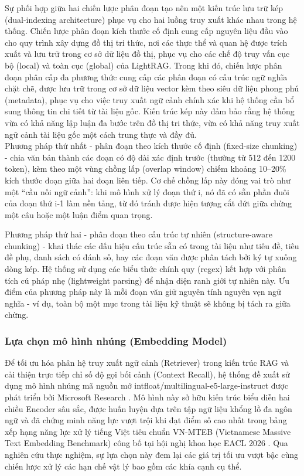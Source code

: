 \indent Sự phối hợp giữa hai chiến lược phân đoạn tạo nên một kiến trúc lưu trữ kép (dual-indexing architecture) phục vụ cho hai luồng truy xuất khác nhau trong hệ thống. Chiến lược phân đoạn kích thước cố định cung cấp nguyên liệu đầu vào cho quy trình xây dựng đồ thị tri thức, nơi các thực thể và quan hệ được trích xuất và lưu trữ trong cơ sở dữ liệu đồ thị, phục vụ cho các chế độ truy vấn cục bộ (local) và toàn cục (global) của LightRAG. Trong khi đó, chiến lược phân đoạn phân cấp đa phương thức cung cấp các phân đoạn có cấu trúc ngữ nghĩa chặt chẽ, được lưu trữ trong cơ sở dữ liệu vector kèm theo siêu dữ liệu phong phú (metadata), phục vụ cho việc truy xuất ngữ cảnh chính xác khi hệ thống cần bổ sung thông tin chi tiết từ tài liệu gốc. Kiến trúc kép này đảm bảo rằng hệ thống vừa có khả năng lập luận đa bước trên đồ thị tri thức, vừa có khả năng truy xuất ngữ cảnh tài liệu gốc một cách trung thực và đầy đủ. \\ \indent Phương pháp thứ nhất - phân đoạn theo kích thước cố định (fixed-size chunking) - chia văn bản thành các đoạn có độ dài xác định trước (thường từ 512 đến 1200 token), kèm theo một vùng chồng lấp (overlap window) chiếm khoảng 10–20\% kích thước đoạn giữa hai đoạn liên tiếp. Cơ chế chồng lấp này đóng vai trò như một ``cầu nối ngữ cảnh'': khi mô hình xử lý đoạn thứ i, nó đã có sẵn phần đuôi của đoạn thứ i-1 làm nền tảng, từ đó tránh được hiện tượng cắt đứt giữa chừng một câu hoặc một luận điểm quan trọng.

\indent Phương pháp thứ hai - phân đoạn theo cấu trúc tự nhiên (structure-aware chunking) - khai thác các dấu hiệu cấu trúc sẵn có trong tài liệu như tiêu đề, tiêu đề phụ, danh sách có đánh số, hay các đoạn văn được phân tách bởi ký tự xuống dòng kép. Hệ thống sử dụng các biểu thức chính quy (regex) kết hợp với phân tích cú pháp nhẹ (lightweight parsing) để nhận diện ranh giới tự nhiên này. Ưu điểm của phương pháp này là mỗi đoạn văn giữ nguyên tính nguyên vẹn ngữ nghĩa - ví dụ, toàn bộ một mục trong tài liệu kỹ thuật sẽ không bị tách ra giữa chừng.

\subsubsection{Lựa chọn mô hình nhúng (Embedding Model)}

\indent Để tối ưu hóa phân hệ truy xuất ngữ cảnh (Retriever) trong kiến trúc RAG và cải thiện trực tiếp chỉ số độ gọi bối cảnh (Context Recall), hệ thống đề xuất sử dụng mô hình nhúng mã nguồn mở intfloat/multilingual-e5-large-instruct được phát triển bởi Microsoft Research \cite{multilingual_e5}. Mô hình này sở hữu kiến trúc biểu diễn hai chiều Encoder sâu sắc, được huấn luyện dựa trên tập ngữ liệu khổng lồ đa ngôn ngữ và đã chứng minh năng lực vượt trội khi đạt điểm số cao nhất trong bảng xếp hạng năng lực xử lý tiếng Việt tiêu chuẩn VN-MTEB (Vietnamese Massive Text Embedding Benchmark) công bố tại hội nghị khoa học EACL 2026 \cite{vn_mteb_eacl}. Qua nghiên cứu thực nghiệm, sự lựa chọn này đem lại các giá trị tối ưu vượt bậc cùng chiến lược xử lý các hạn chế vật lý bao gồm các khía cạnh cụ thể.

